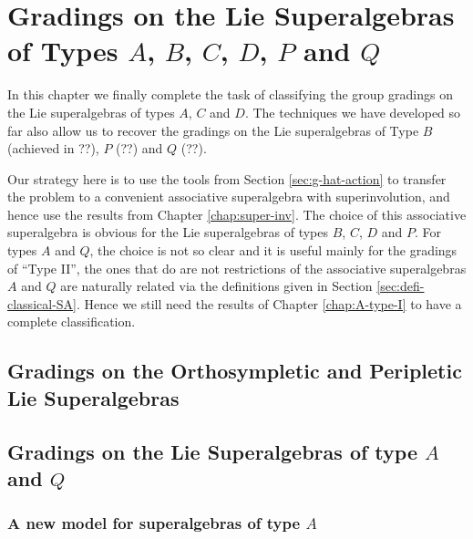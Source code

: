 \chapter{Gradings on the Lie Superalgebras of Types $A$, $B$, $C$, $D$, $P$ and $Q$}

In this chapter we finally complete the task of classifying the group gradings on the Lie superalgebras of types $A$, $C$ and $D$.
The techniques we have developed so far also allow us to recover the gradings on the Lie superalgebras of Type $B$ (achieved in ??), $P$ (??) and $Q$ (??).

Our strategy here is to use the tools from Section \ref{sec:g-hat-action} to transfer the problem to a convenient associative superalgebra with superinvolution, and hence use the results from Chapter \ref{chap:super-inv}.
The choice of this associative superalgebra is obvious for the Lie superalgebras of types $B$, $C$, $D$ and $P$.
For types $A$ and $Q$, the choice is not so clear and it is useful mainly for the gradings of ``Type II'', the ones that do are not restrictions of the associative superalgebras $A$ and $Q$ are naturally related via the definitions given in Section \ref{sec:defi-classical-SA}.
Hence we still need the results of Chapter \ref{chap:A-type-I} to have a complete classification.

\section{Gradings on the Orthosympletic and Peripletic Lie Superalgebras}
\section{Gradings on the Lie Superalgebras of type $A$ and $Q$}
\subsection{A new model for superalgebras of type $A$}


